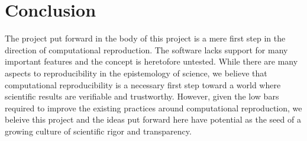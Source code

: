 \hypertarget{conclusion}{%
\section{Conclusion}\label{conclusion}}

The project put forward in the body of this project is a mere first step in the direction of computational reproduction. The software lacks support for many important features and the concept is heretofore untested. While there are many aspects to reproducibility in the epistemology of science, we believe that computational reproducibility is a necessary first step toward a world where scientific results are verifiable and trustworthy. However, given the low bars required to improve the existing practices around computational reproduction, we beleive this project and the ideas put forward here have potential as the seed of a growing culture of scientific rigor and transparency. 
